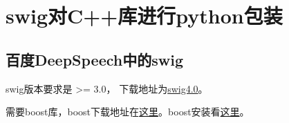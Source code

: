 \section{swig对C++库进行python包装}

\subsection{百度DeepSpeech中的swig}


swig版本要求是 >= 3.0， 下载地址为\href{https://sourceforge.net/projects/swig/files/swig/swig-4.0.1/swig-4.0.1.tar.gz/download?use_mirror=nchc}{swig4.0}。

需要boost库，boost下载地址在\href{https://dl.bintray.com/boostorg/release/1.67.0/source/boost_1_67_0.tar.gz}{这里}。boost安装看\href{https://blog.csdn.net/zhangzq86/article/details/81082810}{这里}。